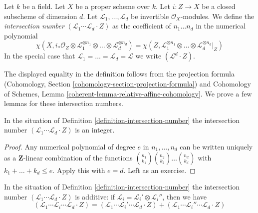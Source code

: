 \begin{definition}
\label{definition-intersection-number}
Let $k$ be a field. Let $X$ be a proper scheme over $k$. Let
$i : Z \to X$ be a closed subscheme of dimension $d$. Let
$\mathcal{L}_1, \ldots, \mathcal{L}_d$ be invertible
$\mathcal{O}_X$-modules. We define the {\it intersection number}
$(\mathcal{L}_1 \cdots \mathcal{L}_d \cdot Z)$
as the coefficient of $n_1 \ldots n_d$ in the numerical polynomial
$$
\chi(X, i_*\mathcal{O}_Z \otimes \mathcal{L}_1^{\otimes n_1} \otimes
\ldots \otimes \mathcal{L}_d^{\otimes n_d}) =
\chi(Z, \mathcal{L}_1^{\otimes n_1} \otimes
\ldots \otimes \mathcal{L}_d^{\otimes n_d}|_Z)
$$
In the special
case that $\mathcal{L}_1 = \ldots = \mathcal{L}_d = \mathcal{L}$
we write $(\mathcal{L}^d \cdot Z)$.
\end{definition}

\noindent
The displayed equality in the definition follows from
the projection formula
(Cohomology, Section \ref{cohomology-section-projection-formula}) and
Cohomology of Schemes, Lemma
\ref{coherent-lemma-relative-affine-cohomology}.
We prove a few lemmas for these intersection numbers.

\begin{lemma}
\label{lemma-intersection-number-integer}
In the situation of Definition \ref{definition-intersection-number}
the intersection number
$(\mathcal{L}_1 \cdots \mathcal{L}_d \cdot Z)$
is an integer.
\end{lemma}

\begin{proof}
Any numerical polynomial of degree $e$ in $n_1, \ldots, n_d$ can be
written uniquely as a $\mathbf{Z}$-linear combination of the functions
${n_1 \choose k_1}{n_2 \choose k_2} \ldots {n_d \choose k_d}$ with
$k_1 + \ldots + k_d \leq e$. Apply this with $e = d$.
Left as an exercise.
\end{proof}

\begin{lemma}
\label{lemma-intersection-number-additive}
In the situation of Definition \ref{definition-intersection-number}
the intersection number
$(\mathcal{L}_1 \cdots \mathcal{L}_d \cdot Z)$
is additive: if $\mathcal{L}_i = \mathcal{L}_i' \otimes \mathcal{L}_i''$,
then we have
$$
(\mathcal{L}_1 \cdots \mathcal{L}_i \cdots \mathcal{L}_d \cdot Z) =
(\mathcal{L}_1 \cdots \mathcal{L}_i' \cdots \mathcal{L}_d \cdot Z) +
(\mathcal{L}_1 \cdots \mathcal{L}_i'' \cdots \mathcal{L}_d \cdot Z)
$$
\end{lemma}

